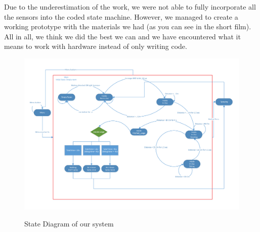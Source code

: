 \documentclass[a4paper, 12pt]{article}
\begin{document}
Due to the underestimation of the work, we were not able to fully incorporate all the sensors into the coded state machine. However, we managed to create a working prototype with the materials we had (as you can see in the short film). All in all, we think we did the best we can and we have encountered what it means to work with hardware instead of only writing code.


\newpage
\begin{landscape}
\begin{figure}[h!]
\includegraphics[scale=0.75]{State_Diagram.pdf}
\label{fig:stateDia}
\caption{State Diagram of our system}
\end{figure}
\end{landscape}
\end{document}
